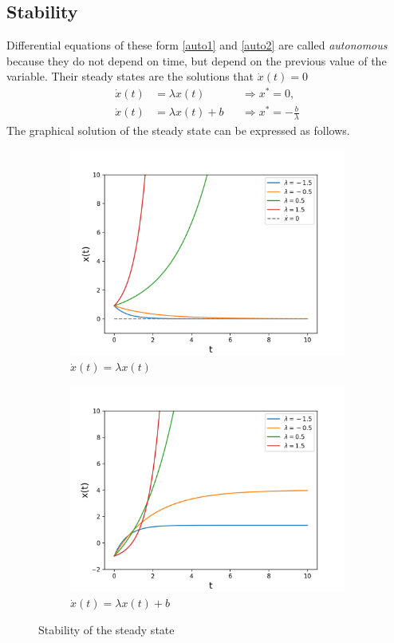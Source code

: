 \documentclass[11pt,a4paper]{book}
\theoremstyle{definition}\newtheorem{definition}{Definition}
\theoremstyle{definition}\newtheorem{fact}{Fact}
\theoremstyle{definition}\newtheorem{remark}{Remark}
\theoremstyle{definition}\newtheorem{ex}{Ex.}
\theoremstyle{definition}\newtheorem{project}{Project}
\theoremstyle{definition}\newtheorem{problem}{Problem}
\theoremstyle{definition}\newtheorem{example}{Example}
\numberwithin{theorem}{section}
\numberwithin{corollary}{chapter}
\numberwithin{assumption}{chapter}
\numberwithin{definition}{chapter}
\numberwithin{prop}{chapter}
\numberwithin{notation}{chapter}
\numberwithin{problem}{chapter}
\numberwithin{example}{chapter}
\numberwithin{fact}{chapter}
\numberwithin{ex}{chapter}
\begin{document}
	\subsection{Stability}
	
	Differential equations of these form \eqref{auto1} and \eqref{auto2} are called \textit{autonomous} because they do not depend on time, but depend on the previous value of the variable. Their steady states are the solutions that $\dot{x}(t) = 0$
	\begin{align*}
		\dot{x}(t) &= \lambda x(t) && \Rightarrow x^* = 0, \\
		\dot{x}(t) &= \lambda x(t) + b && \Rightarrow x^* = -\frac{b}{\lambda}
	\end{align*}
	The graphical solution of the steady state can be expressed as follows.
	
	\begin{figure}[ht]
\centering
\begin{subfigure}[b]{0.45\linewidth}
\includegraphics[width=\linewidth]{figs/ode.png}
\caption{$\dot{x}(t)= \lambda x(t)$}
\end{subfigure}
\begin{subfigure}[b]{0.45\linewidth}
\includegraphics[width=\linewidth]{figs/ode2.png}
\caption{$\dot{x}(t)= \lambda x(t) + b$}
\end{subfigure}
\caption{Stability of the steady state}
\end{figure}
	
\end{document}
